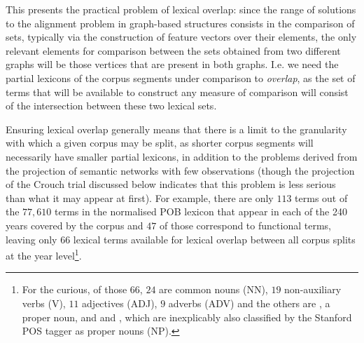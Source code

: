 This presents the practical problem of lexical overlap: since the range of solutions to the alignment problem in graph-based structures consists in the comparison of sets, typically via the construction of feature vectors over their elements, the only relevant elements for comparison between the sets obtained from two different graphs will be those vertices that are present in both graphs.
I.e. we need the partial lexicons of the corpus segments under comparison to \emph{overlap}, as the set of terms that will be available to construct any measure of comparison will consist of the intersection between these two lexical sets.

Ensuring lexical overlap generally means that there is a limit to the granularity with which a given corpus may be split, as shorter corpus segments will necessarily have smaller partial lexicons, in addition to the problems derived from the projection of semantic networks with few observations (though the projection of the Crouch trial discussed below indicates that this problem is less serious than what it may appear at first).
For example, there are only $113$ terms out of the $77,610$ terms in the normalised POB lexicon that appear in each of the 240 years covered by the corpus and $47$ of those correspond to functional terms, leaving only $66$ lexical terms available for lexical overlap between all corpus splits at the year level\footnote{
    For the curious, of those $66$, $24$ are common nouns (NN), $19$ non-auxiliary verbs (V), $11$ adjectives (ADJ), $9$ adverbs (ADV) and the others are , a proper noun, and  and , which are inexplicably also classified by the Stanford POS tagger as proper nouns (NP).
}.

